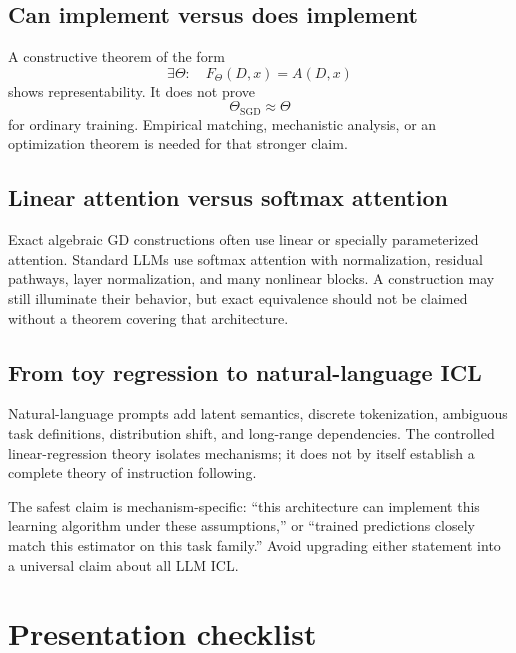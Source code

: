 \documentclass[11pt,a4paper,oneside,openany]{memoir}
\theoremstyle{definition}
\begin{document}
\section{Can implement versus does implement}
A constructive theorem of the form
\[
\exists\Theta:\quad F_\Theta(D,x)=A(D,x)
\]
shows representability.  It does not prove
\[
\Theta_{\mathrm{SGD}}\approx\Theta
\]
for ordinary training.  Empirical matching, mechanistic analysis, or an optimization theorem is needed for that stronger claim.

\section{Linear attention versus softmax attention}
Exact algebraic GD constructions often use linear or specially parameterized attention.  Standard LLMs use softmax attention with normalization, residual pathways, layer normalization, and many nonlinear blocks.  A construction may still illuminate their behavior, but exact equivalence should not be claimed without a theorem covering that architecture.

\section{From toy regression to natural-language ICL}
Natural-language prompts add latent semantics, discrete tokenization, ambiguous task definitions, distribution shift, and long-range dependencies.  The controlled linear-regression theory isolates mechanisms; it does not by itself establish a complete theory of instruction following.

\begin{presentbox}
The safest claim is mechanism-specific: ``this architecture can implement this learning algorithm under these assumptions,'' or ``trained predictions closely match this estimator on this task family.''  Avoid upgrading either statement into a universal claim about all LLM ICL.
\end{presentbox}

\chapter{Presentation checklist}
\end{document}
